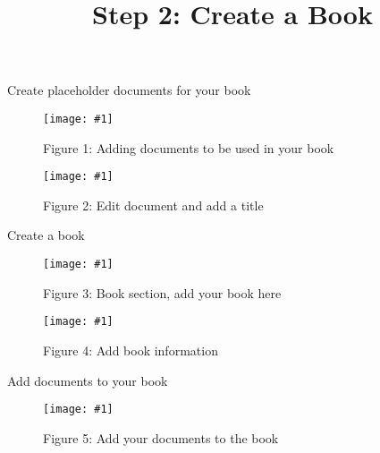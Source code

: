 \documentclass{article}
\newlength{\imgwidth}
\newcommand\scaledgraphics[2]{%
                
\settowidth{\imgwidth}{\texttt{[image: \#1]}}%
                
\setlength{\imgwidth}{\minof{\imgwidth}{#2\textwidth}}%
                
\texttt{[image: \#1]}%
                
}
\begin{document}
\title{Step 2: Create a Book}

\maketitle


Create placeholder documents for your book

\begin{figure}
\scaledgraphics{9e5d1d14-244e-4d55-b1f9-effb37b619e9.png}{1}
\caption*{Figure 1: Adding documents to be used in your book}\label{F35194901}
\end{figure}

\begin{figure}
\scaledgraphics{2be7082d-cf81-4659-be99-15f41a555f0a.png}{1}
\caption*{Figure 2: Edit document and add a title}\label{F72135581}
\end{figure}





Create a book

\begin{figure}
\scaledgraphics{e38b98ce-9984-4980-9b46-52a2a0acdbe5.png}{1}
\caption*{Figure 3: Book section, add your book here}\label{F3646981}
\end{figure}

\begin{figure}
\scaledgraphics{8a7e23ca-ece1-4c13-8192-e6b2ff7e5fc0.png}{1}
\caption*{Figure 4: Add book information}\label{F63655341}
\end{figure}


Add documents to your book

\begin{figure}
\scaledgraphics{1a7c5c9b-9451-4bd9-a21f-c0897cfb9d07.png}{1}
\caption*{Figure 5: Add your documents to the book}\label{F21078281}
\end{figure}





  
\end{document}
